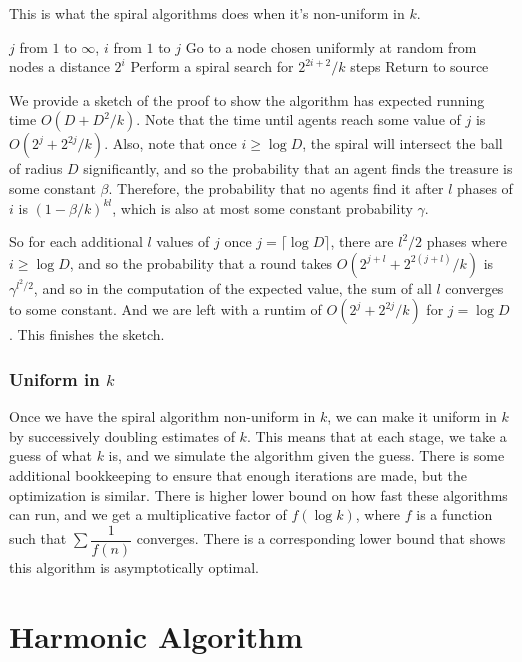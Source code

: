 \documentclass[runningheads,a4paper]{llncs}
\begin{document}
This is what the spiral algorithms does when it's non-uniform in $k$. 

\begin{codebox}
\li \For $j$ from $1$ to $\infty$, \Then
\li \For $i$ from $1$ to $j$ \Then
\li Go to a node chosen uniformly at random from nodes a distance $2^{i}$
\li Perform a spiral search for $2^{2i+2}/k$ steps
\li Return to source \End \End 
\end{codebox}

We provide a sketch of the proof to show the algorithm has expected running time $O(D + D^2/k)$. Note that the time until agents reach some value of $j$ is $O(2^j + 2^{2j}/k)$. Also, note that once $i \geq \log D$, the spiral will intersect the ball of radius $D$ significantly, and so the probability that an agent finds the treasure is some constant $\beta$. Therefore, the probability that no agents find it after $l$ phases of $i$ is $(1 - \beta/k)^{kl}$, which is also at most some constant probability $\gamma$.

So for each additional $l$ values of $j$ once $j = \lceil \log D \rceil$, there are $l^2/2$ phases where $i \geq \log D$, and so the probability that a round takes $O(2^{j + l} + 2^{2(j+l)}/k)$ is $\gamma^{l^2/2}$, and so in the computation of the expected value, the sum of all $l$ converges to some constant. And we are left with a runtim of $O(2^{j} + 2^{2j}/k)$ for $j = \log D$. This finishes the sketch.

\subsubsection{Uniform in $k$}

Once we have the spiral algorithm non-uniform in $k$, we can make it uniform in $k$ by successively doubling estimates of $k$. This means that at each stage, we take a guess of what $k$ is, and we simulate the algorithm given the guess. There is some additional bookkeeping to ensure that enough iterations are made, but the optimization is similar. There is higher lower bound on how fast these algorithms can run, and we get a multiplicative factor of $f(\log k)$, where $f$ is a function such that $\sum \dfrac{1}{f(n)}$ converges. There is a corresponding lower bound that shows this algorithm is asymptotically optimal.

\section{Harmonic Algorithm}
\label{harmonic}
\end{document}
